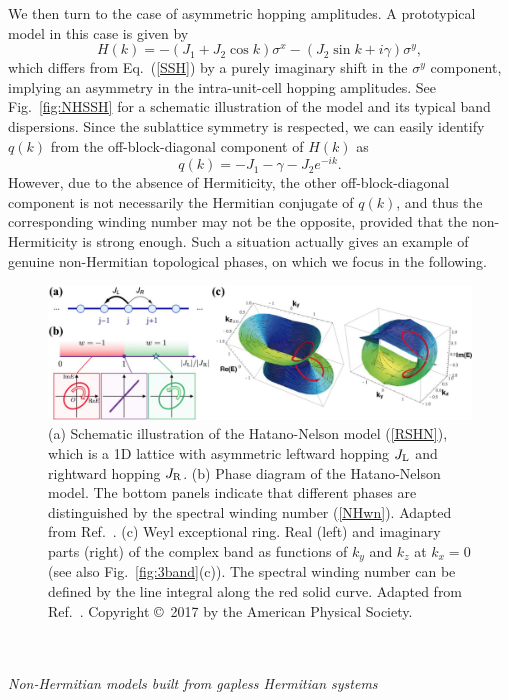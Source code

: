 \documentclass{tADP2e}
\theoremstyle{plain}
\theoremstyle{plain}
\theoremstyle{definition}
\begin{document}
We then turn to the case of asymmetric hopping amplitudes. A prototypical model in this case is given by \cite{LTE16,YS18a}
\begin{equation}
H(k)=-(J_1+J_2\cos k)\sigma^x-(J_2\sin k+i\gamma)\sigma^y,
\label{asyhSSH}
\end{equation}
which differs from Eq.~(\ref{SSH}) by a purely imaginary shift in the $\sigma^y$ component, implying an asymmetry in the intra-unit-cell hopping amplitudes. See Fig.~\ref{fig:NHSSH} for a schematic illustration of the model and its typical band dispersions. Since the sublattice symmetry is respected, we can easily identify $q(k)$ from the off-block-diagonal component of $H(k)$ as
\begin{equation}
q(k)=-J_1-\gamma-J_2e^{-ik}.
\end{equation}
However, due to the absence of Hermiticity, the other off-block-diagonal component is not necessarily the Hermitian conjugate of $q(k)$, and thus the corresponding winding number may not be the opposite, provided that the non-Hermiticity is strong enough. Such a situation actually gives an example of genuine non-Hermitian topological phases, on which we focus in the following. 
\begin{figure}[!t]
\begin{center}
\includegraphics[width=14.5cm]{./Figures/fig_5_ptgtopo.pdf}
\end{center}
\caption{(a) Schematic illustration of the Hatano-Nelson model (\ref{RSHN}), which is a 1D lattice with asymmetric leftward hopping $J_{\rm L}$ and rightward hopping $J_{\rm R}$. (b) Phase diagram of the Hatano-Nelson model. The bottom panels indicate that different phases are distinguished by the spectral winding number (\ref{NHwn}). Adapted from Ref.~\cite{ZG18}. (c) Weyl exceptional ring. Real (left) and imaginary parts (right) of the complex band as functions of $k_y$ and $k_z$ at $k_x=0$ (see also Fig.~\ref{fig:3band}(c)). The spectral winding number can be defined by the line integral along the red solid curve. Adapted from Ref.~\cite{XY17}. Copyright \copyright\,    2017 by the American Physical Society. }
\label{fig:ptgtopo}
\end{figure}
\\ \\ {\it Non-Hermitian models built from gapless Hermitian systems}
\end{document}
